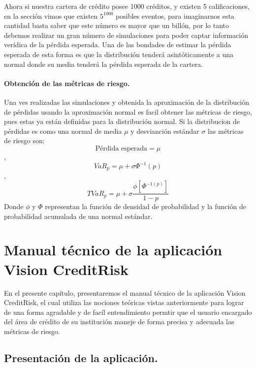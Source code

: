 \documentclass[
  12pt,
]{krantz}
\theoremstyle{definition}
\theoremstyle{definition}
\theoremstyle{definition}
\theoremstyle{remark}
\begin{document}
Ahora si nuestra cartera de crédito posee 1000 créditos, y existen 5 calificaciones, en la sección vimos que existen \(5^{1000}\) posibles eventos, para imaginarnos esta cantidad basta saber que este número es mayor que un billón, por lo tanto debemos realizar un gran número de simulaciones para poder captar información verídica de la pérdida esperada. Una de las bondades de estimar la pérdida esperada de esta forma es que la distribución tenderá asintóticamente a una normal donde su media tenderá la pérdida esperada de la cartera.

\hypertarget{obtencion-de-las-metricas-de-riesgo.}{%
\subsubsection{Obtención de las métricas de riesgo.}\label{obtencion-de-las-metricas-de-riesgo.}}

Una ves realizadas las simulaciones y obtenida la aproximación de la distribución de pérdidas usando la aproximación normal es facil obtener las métricas de riesgo, pues estas ya están definidas para la distribución normal. Si la distribucion de pérdidas es como una normal de media \(\mu\) y desvianción estándar \(\sigma\) las métricas de riesgo son: \[\textrm{Pérdida esperada}=\mu\],\[VaR_{p}=\mu+\sigma\Phi^{-1}(p)\],\[TVaR_p=\mu+\sigma\frac{\phi[\Phi^{-1(p)}]}{1-p}\]
Donde \(\phi\) y \(\Phi\) representan la función de densidad de probabilidad y la función de probabilidad acumulada de una normal estándar.

\mainmatter

\hypertarget{manual-tecnico-de-la-aplicacion-vision-creditrisk}{%
\chapter{Manual técnico de la aplicación Vision CreditRisk}\label{manual-tecnico-de-la-aplicacion-vision-creditrisk}}

En el presente capítulo, presentaremos el manual técnico de la aplicación Vision CreditRisk, el cual utiliza las nociones teóricas vistas anteriormente para lograr de una forma agradable y de facíl entendimiento permtir que el usuario encargado del área de crédito de su institución maneje de forma precisa y adecuada las métricas de riesgo.

\hypertarget{presentacion-de-la-aplicacion.}{%
\section{Presentación de la aplicación.}\label{presentacion-de-la-aplicacion.}}
\end{document}
